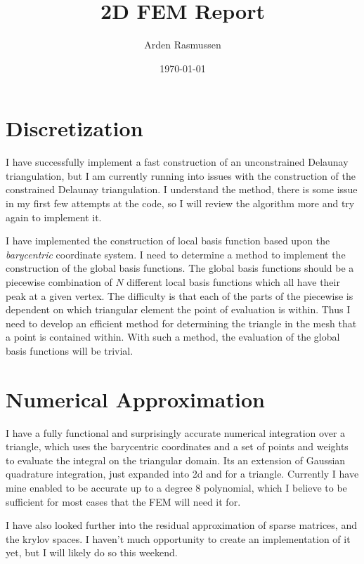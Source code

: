 \documentclass[10pt]{amsart}
\title{2D FEM Report}
\author{Arden Rasmussen}
\date{\today}
\numberwithin{equation}{section}
\theoremstyle{definition}
\begin{document}
\maketitle
\begin{multicols}{2}
  \section{Discretization}%
  \label{sec:descretization}

  I have successfully implement a fast construction of an unconstrained
  Delaunay triangulation, but I am currently running into issues with the
  construction of the constrained Delaunay triangulation. I understand the
  method, there is some issue in my first few attempts at the code, so I will
  review the algorithm more and try again to implement it.

  I have implemented the construction of local basis function based upon the
  \emph{barycentric} coordinate system. I need to determine a method to
  implement the construction of the global basis functions. The global basis
  functions should be a piecewise combination of $N$ different local basis
  functions which all have their peak at a given vertex. The difficulty is that
  each of the parts of the piecewise is dependent on which triangular element
  the point of evaluation is within. Thus I need to develop an efficient method
  for determining the triangle in the mesh that a point is contained within.
  With such a method, the evaluation of the global basis functions will be
  trivial.

  \section{Numerical Approximation}%
  \label{sec:numerical_approximation}
  
  I have a fully functional and surprisingly accurate numerical integration
  over a triangle, which uses the barycentric coordinates and a set of points
  and weights to evaluate the integral on the triangular domain. Its an
  extension of Gaussian quadrature integration, just expanded into 2d and for a
  triangle. Currently I have mine enabled to be accurate up to a degree $8$
  polynomial, which I believe to be sufficient for most cases that the FEM will
  need it for.

  I have also looked further into the residual approximation of sparse
  matrices, and the krylov spaces. I haven't much opportunity to create an
  implementation of it yet, but I will likely do so this weekend.


\end{multicols}
\end{document}
